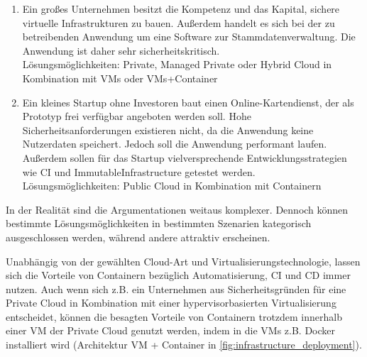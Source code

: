\documentclass[../main.tex]{subfiles}
\begin{document}
  \begin{enumerate}
    \item Ein großes Unternehmen besitzt die Kompetenz und das Kapital, sichere virtuelle Infrastrukturen zu bauen. Außerdem handelt es sich bei der zu betreibenden Anwendung um eine Software zur Stammdatenverwaltung. Die Anwendung ist daher sehr sicherheitskritisch. \\
    Lösungsmöglichkeiten: Private, Managed Private oder Hybrid Cloud in Kombination mit VMs oder VMs+Container
    \item Ein kleines Startup ohne Investoren baut einen Online-Kartendienst, der als Prototyp frei verfügbar angeboten werden soll. Hohe Sicherheitsanforderungen existieren nicht, da die Anwendung keine Nutzerdaten speichert. Jedoch soll die Anwendung performant laufen. Außerdem sollen für das Startup vielversprechende Entwicklungsstrategien wie \acrshort{CI} und \gls{ImmutableInfrastructure} getestet werden.  \\
    Lösungsmöglichkeiten: Public Cloud in Kombination mit Containern
  \end{enumerate}

  In der Realität sind die Argumentationen weitaus komplexer. Dennoch können bestimmte Lösungsmöglichkeiten in bestimmten Szenarien kategorisch ausgeschlossen werden, während andere attraktiv erscheinen.

  Unabhängig von der gewählten Cloud-Art und Virtualisierungstechnologie, lassen sich die Vorteile von Containern bezüglich Automatisierung, \acrshort{CI} und \acrshort{CD} immer nutzen. Auch wenn sich z.B. ein Unternehmen aus Sicherheitsgründen für eine Private Cloud in Kombination mit einer hypervisorbasierten Virtualisierung entscheidet, können die besagten Vorteile von Containern trotzdem innerhalb einer VM der Private Cloud genutzt werden, indem in die VMs z.B. Docker installiert wird (Architektur \glqq{}VM + Container\grqq{} in \fig \ref{fig:infrastructure_deployment}).


\end{document}
